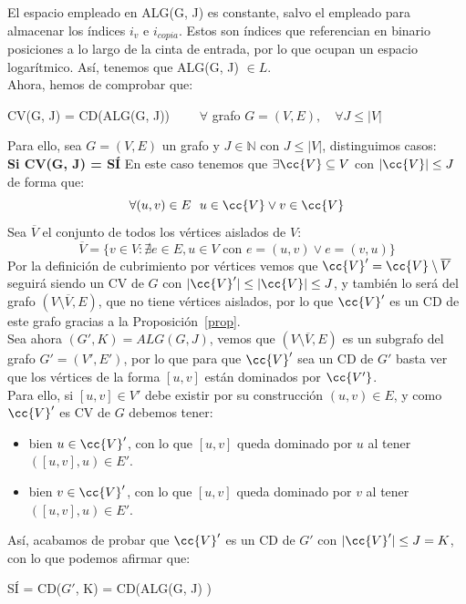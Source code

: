 \documentclass[12pt]{article}
\newcommand{\CV}{CV(G, J) }
\newcommand{\ALG}{ALG(G, J) }
\begin{document}
    \noindent
    El espacio empleado en \ALG es constante, salvo el empleado para almacenar los índices $i_v$ e $i_{copia}$. Estos son índices que referencian en binario posiciones a lo largo de la cinta de entrada, por lo que ocupan un espacio logarítmico. Así, tenemos que \ALG $\in L$.\\

    \noindent
    Ahora, hemos de comprobar que:
    \begin{center} 
        \CV = CD(ALG(G, J)) $\qquad \forall$ grafo $G=(V,E), \quad \forall J\leq |V|$
    \end{center}
    Para ello, sea $G=(V,E)$ un grafo y $J\in \mathbb{N}$ con $J\leq |V|$, distinguimos casos:\\

    \noindent
    \textbf{Si \CV = SÍ}\newline
    En este caso tenemos que $\exists \cc{V}\subseteq V$ con $|\cc{V}|\leq J$ de forma que:
    \begin{equation*}
        \forall (u,v)\in E~~u\in \cc{V}\lor v\in \cc{V}
    \end{equation*}
    Sea $\overline{V}$ el conjunto de todos los vértices aislados de $V$:
    \begin{equation*}
        \overline{V} = \{v\in V : \nexists e\in E, u\in V \text{\ con\ } e = (u,v) \lor e = (v,u)\}
    \end{equation*}
    Por la definición de cubrimiento por vértices vemos que $\cc{V}' = \cc{V}\setminus \overline{V}$ seguirá siendo un CV de $G$ con $|\cc{V}'|\leq |\cc{V}|\leq J$, y también lo será del grafo $(V\setminus \overline{V},E)$, que no tiene vértices aislados, por lo que $\cc{V}'$ es un CD de este grafo gracias a la Proposición~\ref{prop}.\\

    \noindent
    Sea ahora $(G',K) = \ALG$, vemos que $(V\setminus \overline{V}, E)$ es un subgrafo del grafo $G' = (V',E')$, por lo que para que $\cc{V}'$ sea un CD de $G'$ basta ver que los vértices de la forma $[u,v]$ están dominados por $\cc{V'}$.\\

    \noindent
    Para ello, si $[u,v]\in V'$ debe existir por su construcción $(u,v)\in E$, y como $\cc{V}'$ es CV de $G$ debemos tener:
    \begin{itemize}
        \item bien $u\in \cc{V}'$, con lo que $[u,v]$ queda dominado por $u$ al tener $([u,v],u)\in E'$.
        \item bien $v\in \cc{V}'$, con lo que $[u,v]$ queda dominado por $v$ al tener $([u,v],u)\in E'$.
    \end{itemize}
    Así, acabamos de probar que $\cc{V}'$ es un CD de $G'$ con $|\cc{V}'|\leq J = K$, con lo que podemos afirmar que:
    \begin{center}
        SÍ = CD($G'$, K) = CD(\ALG)
    \end{center}
\end{document}
